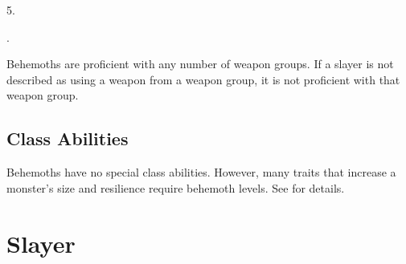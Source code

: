          5.

         .

        Behemoths are proficient with any number of weapon groups.
        If a slayer is not described as using a weapon from a weapon group, it is not proficient with that weapon group.

    \subsection{Class Abilities}
        Behemoths have no special class abilities.
        However, many traits that increase a monster's size and resilience require behemoth levels.
        See  for details.

\section{Slayer}\label{Slayer}

